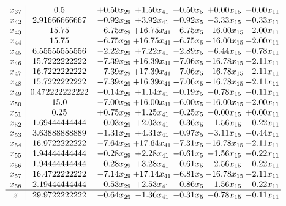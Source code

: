 \documentclass[8pt]{article}
\begin{document}
\[\begin{array}{c| c c@{\hskip 2pt} c@{\hskip 2pt} c@{\hskip 2pt} c@{\hskip 2pt} c@{\hskip 2pt} }
 x_{37}   &  0.5 & +  0.50 x_{29} & +  1.50 x_{41} & +  0.50 x_{5} & +  0.00 x_{15} & -0.00 x_{11}\\
 x_{42}   &  2.91666666667 & -0.92 x_{29} & +  3.92 x_{41} & -0.92 x_{5} & -3.33 x_{15} & -0.33 x_{11}\\
 x_{43}   &  15.75 & -6.75 x_{29} & + 16.75 x_{41} & -6.75 x_{5} & -16.00 x_{15} & -2.00 x_{11}\\
 x_{44}   &  15.75 & -6.75 x_{29} & + 16.75 x_{41} & -6.75 x_{5} & -16.00 x_{15} & -2.00 x_{11}\\
 x_{45}   &  6.55555555556 & -2.22 x_{29} & +  7.22 x_{41} & -2.89 x_{5} & -6.44 x_{15} & -0.78 x_{11}\\
 x_{46}   &  15.7222222222 & -7.39 x_{29} & + 16.39 x_{41} & -7.06 x_{5} & -16.78 x_{15} & -2.11 x_{11}\\
 x_{47}   &  16.7222222222 & -7.39 x_{29} & + 17.39 x_{41} & -7.06 x_{5} & -16.78 x_{15} & -2.11 x_{11}\\
 x_{48}   &  15.7222222222 & -7.39 x_{29} & + 16.39 x_{41} & -7.06 x_{5} & -16.78 x_{15} & -2.11 x_{11}\\
 x_{49}   &  0.472222222222 & -0.14 x_{29} & +  1.14 x_{41} & +  0.19 x_{5} & -0.78 x_{15} & -0.11 x_{11}\\
 x_{50}   &  15.0 & -7.00 x_{29} & + 16.00 x_{41} & -6.00 x_{5} & -16.00 x_{15} & -2.00 x_{11}\\
 x_{51}   &  0.25 & +  0.75 x_{29} & +  1.25 x_{41} & -0.25 x_{5} & -0.00 x_{15} & +  0.00 x_{11}\\
 x_{52}   &  1.69444444444 & -0.03 x_{29} & +  2.03 x_{41} & -0.36 x_{5} & -1.56 x_{15} & -0.22 x_{11}\\
 x_{53}   &  3.63888888889 & -1.31 x_{29} & +  4.31 x_{41} & -0.97 x_{5} & -3.11 x_{15} & -0.44 x_{11}\\
 x_{54}   &  16.9722222222 & -7.64 x_{29} & + 17.64 x_{41} & -7.31 x_{5} & -16.78 x_{15} & -2.11 x_{11}\\
 x_{55}   &  1.94444444444 & -0.28 x_{29} & +  2.28 x_{41} & -0.61 x_{5} & -1.56 x_{15} & -0.22 x_{11}\\
 x_{56}   &  1.94444444444 & -0.28 x_{29} & +  3.28 x_{41} & -0.61 x_{5} & -2.56 x_{15} & -0.22 x_{11}\\
 x_{57}   &  16.4722222222 & -7.14 x_{29} & + 17.14 x_{41} & -6.81 x_{5} & -16.78 x_{15} & -2.11 x_{11}\\
 x_{58}   &  2.19444444444 & -0.53 x_{29} & +  2.53 x_{41} & -0.86 x_{5} & -1.56 x_{15} & -0.22 x_{11}\\
\hline
z    &  29.9722222222 & -0.64 x_{29} & -1.36 x_{41} & -0.31 x_{5} & -0.78 x_{15} & -0.11 x_{11}\\
\end{array}\]
\end{document}
